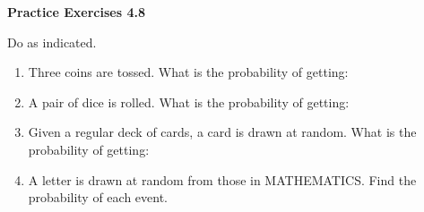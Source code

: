   \vspace{0.3ex}
\noindent\textbf{Practice Exercises 4.8}

\vspace{0.2ex}

Do as indicated. 
\begin{enumerate} 
\item Three coins are tossed. What is the probability of getting:

\begin{enumerate}
\end{enumerate} 

\item A pair of dice is rolled. What is the probability of getting: 

\begin{enumerate}
\end{enumerate} 
\item Given a regular deck of cards, a card is drawn at random. What is the probability of getting:
\begin{enumerate}
\end{enumerate} 
\item A letter is drawn at random from those in MATHEMATICS. Find the probability of each event.
\begin{enumerate}
\end{enumerate} 
 
\end{enumerate}   

 
